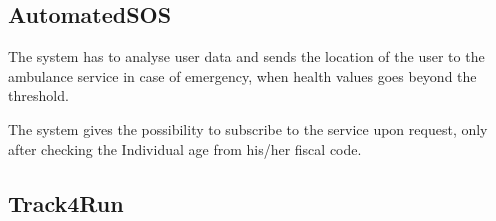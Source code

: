 \subsection{AutomatedSOS}

\begin{enumerate}[label={[}R2.\arabic*{]}, leftmargin=*]

    \item \label{R2-data-and-ambulance} The system has to analyse user data and sends the location of the user to the ambulance service in case of emergency, when health values goes beyond the threshold.
    
    \item \label{R2-subscription} The system gives the possibility to subscribe to the service upon request, only after checking the Individual age from his/her fiscal code.
\end{enumerate}


\subsection{Track4Run}


